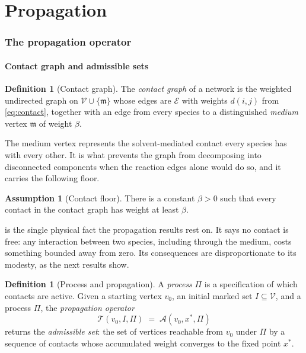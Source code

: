 \documentclass[11pt,twocolumn,a4paper]{article}
\theoremstyle{plain}
\theoremstyle{definition}
\newtheorem{definition}[theorem]{Definition}
\newtheorem{assumption}[theorem]{Assumption}
\theoremstyle{remark}
\newcommand{\Tmap}{\mathcal{T}}
\newcommand{\Adm}{\mathcal{A}}
\begin{document}
\part{Propagation}

\section{The propagation operator}
\label{sec:propagation}

\subsection{Contact graph and admissible sets}

\begin{definition}[Contact graph]
\label{def:contactgraph}
The \emph{contact graph} of a network is the weighted undirected graph on
$\mathcal{V}\cup\{\mathfrak{m}\}$ whose edges are $\mathcal{E}$ with weights
$d(i,j)$ from \cref{eq:contact}, together with an edge from every species to a
distinguished \emph{medium} vertex $\mathfrak{m}$ of weight $\beta$.
\end{definition}

The medium vertex represents the solvent-mediated contact every species has with
every other. It is what prevents the graph from decomposing into disconnected
components when the reaction edges alone would do so, and it carries the
following floor.

\begin{assumption}[Contact floor]
\label{ass:floor}
There is a constant $\beta > 0$ such that every contact in the contact graph has
weight at least $\beta$.
\end{assumption}

 is the single physical fact the propagation results rest on. It
says no contact is free: any interaction between two species, including through
the medium, costs something bounded away from zero. Its consequences are
disproportionate to its modesty, as the next results show.

\begin{definition}[Process and propagation]
\label{def:table}
A \emph{process} $\Pi$ is a specification of which contacts are active. Given a
starting vertex $v_0$, an initial marked set $I \subseteq \mathcal{V}$, and a
process $\Pi$, the \emph{propagation operator}
\begin{equation}
\Tmap(v_0, I, \Pi) \;=\; \Adm(v_0, x^*, \Pi)
\label{eq:Tmap}
\end{equation}
returns the \emph{admissible set}: the set of vertices reachable from $v_0$
under $\Pi$ by a sequence of contacts whose accumulated weight converges to the
fixed point $x^*$.
\end{definition}
\end{document}
